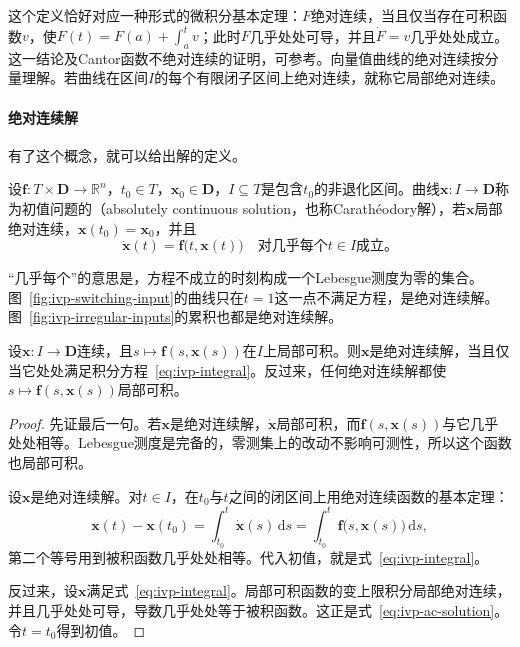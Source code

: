这个定义恰好对应一种形式的微积分基本定理：$F$绝对连续，当且仅当存在可积函数$v$，使$F(t)=F(a)+\int_a^tv$；此时$F$几乎处处可导，并且$\dot{F}=v$几乎处处成立。这一结论及Cantor函数不绝对连续的证明，可参考。向量值曲线的绝对连续按分量理解。若曲线在区间$I$的每个有限闭子区间上绝对连续，就称它局部绝对连续。

\paragraph{绝对连续解}
有了这个概念，就可以给出解的定义。

\begin{definition}[绝对连续解]
 \label{def:ivp-ac-solution}
 设$\bm{f}:T\times\bm{D}\to\mathbb{R}^{n}$，$t_0\in T$，$\bm{x}_0\in\bm{D}$，$I\subseteq T$是包含$t_0$的非退化区间。曲线$\bm{x}:I\to\bm{D}$称为初值问题的（absolutely continuous solution，也称Carathéodory解），若$\bm{x}$局部绝对连续，$\bm{x}(t_0)=\bm{x}_0$，并且
 \begin{equation}
 \dot{\bm{x}}(t)=\bm{f}\bigl(t,\bm{x}(t)\bigr)\quad\text{对几乎每个}t\in I\text{成立。}
 \label{eq:ivp-ac-solution}
 \end{equation}
\end{definition}

“几乎每个”的意思是，方程不成立的时刻构成一个Lebesgue测度为零的集合。图~\ref{fig:ivp-switching-input}的曲线只在$t=1$这一点不满足方程，是绝对连续解。图~\ref{fig:ivp-irregular-inputs}的累积也都是绝对连续解。

\begin{lemma}[积分形式的刻画]
 \label{lem:ivp-ac-integral}
 设$\bm{x}:I\to\bm{D}$连续，且$s\mapsto\bm{f}(s,\bm{x}(s))$在$I$上局部可积。则$\bm{x}$是绝对连续解，当且仅当它处处满足积分方程~\eqref{eq:ivp-integral}。反过来，任何绝对连续解都使$s\mapsto\bm{f}(s,\bm{x}(s))$局部可积。
\end{lemma}

\begin{proof}
 先证最后一句。若$\bm{x}$是绝对连续解，$\dot{\bm{x}}$局部可积，而$\bm{f}(s,\bm{x}(s))$与它几乎处处相等。Lebesgue测度是完备的，零测集上的改动不影响可测性，所以这个函数也局部可积。

 设$\bm{x}$是绝对连续解。对$t\in I$，在$t_0$与$t$之间的闭区间上用绝对连续函数的基本定理：
 \[
 \bm{x}(t)-\bm{x}(t_0)=\int_{t_0}^{t}\dot{\bm{x}}(s)\,\mathrm{d}s
 =\int_{t_0}^{t}\bm{f}\bigl(s,\bm{x}(s)\bigr)\,\mathrm{d}s,
 \]
 第二个等号用到被积函数几乎处处相等。代入初值，就是式~\eqref{eq:ivp-integral}。

 反过来，设$\bm{x}$满足式~\eqref{eq:ivp-integral}。局部可积函数的变上限积分局部绝对连续，并且几乎处处可导，导数几乎处处等于被积函数。这正是式~\eqref{eq:ivp-ac-solution}。令$t=t_0$得到初值。
\end{proof}

